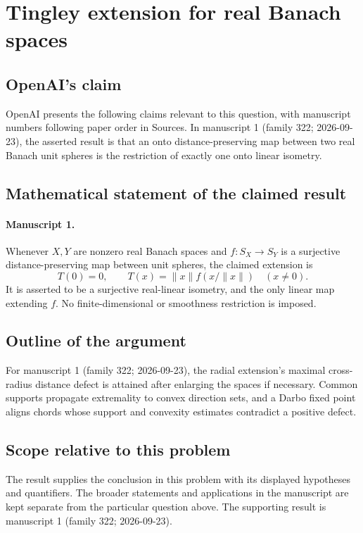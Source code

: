 \documentclass[11pt]{article}
\begin{document}
\section*{Tingley extension for real Banach spaces}

\subsection{OpenAI's claim}
OpenAI presents the following claims relevant to this question, with manuscript numbers following paper order in Sources. In manuscript 1 (family 322; 2026-09-23), the asserted result is that an onto distance-preserving map between two real Banach unit spheres is the restriction of exactly one onto linear isometry.

\subsection{Mathematical statement of the claimed result}
\paragraph{Manuscript 1.}
Whenever $X,Y$ are nonzero real Banach spaces and $f:S_X\to S_Y$ is a surjective distance-preserving map between unit spheres, the claimed extension is
\[
 T(0)=0,\qquad T(x)=\|x\|f(x/\|x\|)\quad(x\ne0).
\]
It is asserted to be a surjective real-linear isometry, and the only linear map extending $f$. No finite-dimensional or smoothness restriction is imposed.

\subsection{Outline of the argument}
For manuscript 1 (family 322; 2026-09-23), the radial extension's maximal cross-radius distance defect is attained after enlarging the spaces if necessary. Common supports propagate extremality to convex direction sets, and a Darbo fixed point aligns chords whose support and convexity estimates contradict a positive defect.

\subsection{Scope relative to this problem}
The result supplies the conclusion in this problem with its displayed hypotheses and quantifiers. The broader statements and applications in the manuscript are kept separate from the particular question above. The supporting result is manuscript 1 (family 322; 2026-09-23).
\end{document}
